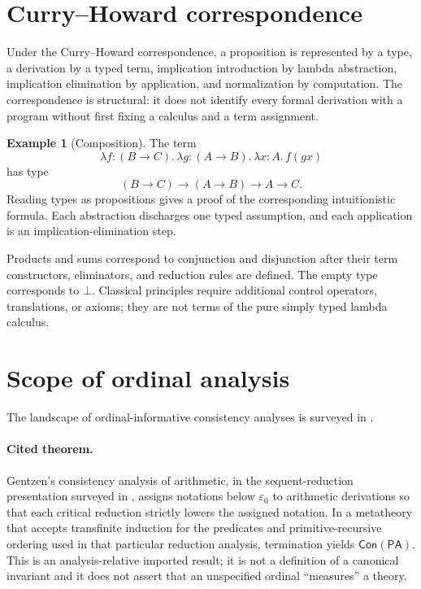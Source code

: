 \documentclass[11pt,oneside,openany]{book}
\theoremstyle{definition}
\newtheorem{example}[definition]{Example}
\theoremstyle{plain}
\theoremstyle{remark}
\newcommand{\bottom}{\bot}
\newcommand{\PA}{\mathsf{PA}}
\begin{document}
\section{Curry--Howard correspondence}
\label{sec:normalization-curry-howard-03}

Under the Curry--Howard correspondence, a proposition is represented by a
type, a derivation by a typed term, implication introduction by lambda
abstraction, implication elimination by application, and normalization by
computation.  The correspondence is structural: it does not identify every
formal derivation with a program without first fixing a calculus and a
term assignment.

\begin{example}[Composition]
The term
\[
  \lambda f{:}(B\to C).\,
  \lambda g{:}(A\to B).\,
  \lambda x{:}A.\,f(gx)
\]
has type
\[
  (B\to C)\to(A\to B)\to A\to C.
\]
Reading types as propositions gives a proof of the corresponding intuitionistic
formula.  Each abstraction discharges one typed assumption, and each
application is an implication-elimination step.
\end{example}

Products and sums correspond to conjunction and disjunction after their term
constructors, eliminators, and reduction rules are defined.  The empty type
corresponds to \(\bottom\).  Classical principles require additional control
operators, translations, or axioms; they are not terms of the pure simply
typed lambda calculus.

\section{Scope of ordinal analysis}
\label{sec:normalization-curry-howard-04}

The landscape of ordinal-informative consistency analyses is surveyed in
\cite{Buss1998}.

\paragraph{Cited theorem.}
Gentzen's consistency analysis of arithmetic, in the sequent-reduction
presentation surveyed in
\cite[Chapter~10, especially Sections~10.1--10.4, pp.~318--337]
     {TroelstraSchwichtenberg2000}, assigns notations below
\(\varepsilon_0\) to arithmetic derivations so that each critical reduction
strictly lowers the assigned notation.  In a metatheory that accepts
transfinite induction for the predicates and primitive-recursive ordering used
in that particular reduction analysis, termination yields
\(\mathsf{Con}(\PA)\).  This is an analysis-relative imported result;
it is not a definition of a canonical invariant and it does not assert that an
unspecified ordinal ``measures'' a theory.
\end{document}
